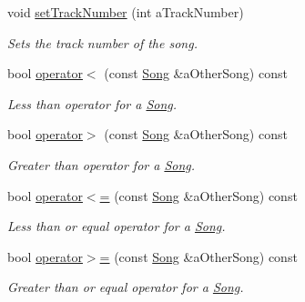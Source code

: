 \begin{DoxyCompactItemize}
void \mbox{\hyperlink{class_song_ab005f32d793e26e83d67132931d46769}{set\+Track\+Number}} (int a\+Track\+Number)
\begin{DoxyCompactList}\small\item\em Sets the track number of the song. \end{DoxyCompactList}\item 
bool \mbox{\hyperlink{class_song_a3e7e21ea87a93f305dbfd4cb9e6bf416}{operator$<$}} (const \mbox{\hyperlink{class_song}{Song}} \&a\+Other\+Song) const
\begin{DoxyCompactList}\small\item\em Less than operator for a \mbox{\hyperlink{class_song}{Song}}. \end{DoxyCompactList}\item 
bool \mbox{\hyperlink{class_song_a1a6cc11df009afe710a7e6103e4c4221}{operator$>$}} (const \mbox{\hyperlink{class_song}{Song}} \&a\+Other\+Song) const
\begin{DoxyCompactList}\small\item\em Greater than operator for a \mbox{\hyperlink{class_song}{Song}}. \end{DoxyCompactList}\item 
bool \mbox{\hyperlink{class_song_a3a4608e2f7744e5c1c8db350be3b24e9}{operator$<$=}} (const \mbox{\hyperlink{class_song}{Song}} \&a\+Other\+Song) const
\begin{DoxyCompactList}\small\item\em Less than or equal operator for a \mbox{\hyperlink{class_song}{Song}}. \end{DoxyCompactList}\item 
bool \mbox{\hyperlink{class_song_aa51d7041e3cb45d2e8cd3e04eac3a16f}{operator$>$=}} (const \mbox{\hyperlink{class_song}{Song}} \&a\+Other\+Song) const
\begin{DoxyCompactList}\small\item\em Greater than or equal operator for a \mbox{\hyperlink{class_song}{Song}}. \end{DoxyCompactList}\end{DoxyCompactItemize}
